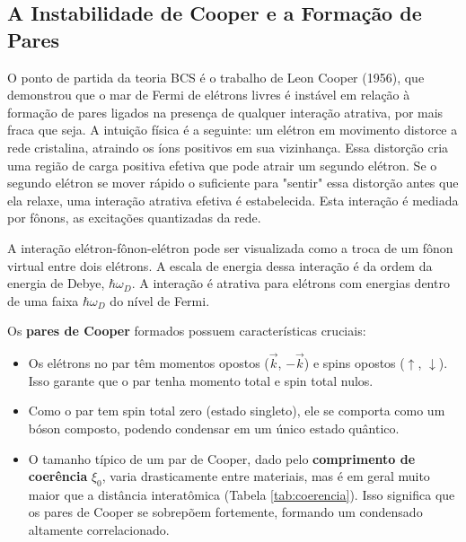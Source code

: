 \documentclass[12pt, a4paper, oneside]{report}
\begin{document}
\subsection{A Instabilidade de Cooper e a Formação de Pares}

O ponto de partida da teoria BCS é o trabalho de Leon Cooper (1956), que demonstrou que o mar de Fermi de elétrons livres é instável em relação à formação de pares ligados na presença de qualquer interação atrativa, por mais fraca que seja. A intuição física é a seguinte: um elétron em movimento distorce a rede cristalina, atraindo os íons positivos em sua vizinhança. Essa distorção cria uma região de carga positiva efetiva que pode atrair um segundo elétron. Se o segundo elétron se mover rápido o suficiente para "sentir" essa distorção antes que ela relaxe, uma interação atrativa efetiva é estabelecida. Esta interação é mediada por fônons, as excitações quantizadas da rede.

A interação elétron-fônon-elétron pode ser visualizada como a troca de um fônon virtual entre dois elétrons. A escala de energia dessa interação é da ordem da energia de Debye, $\hbar \omega_D$. A interação é atrativa para elétrons com energias dentro de uma faixa $\hbar \omega_D$ do nível de Fermi.

Os \textbf{pares de Cooper} formados possuem características cruciais:
\begin{itemize}
    \item Os elétrons no par têm momentos opostos ($\vec{k}$, $-\vec{k}$) e spins opostos ($\uparrow$, $\downarrow$). Isso garante que o par tenha momento total e spin total nulos.
    \item Como o par tem spin total zero (estado singleto), ele se comporta como um bóson composto, podendo condensar em um único estado quântico.
    \item O tamanho típico de um par de Cooper, dado pelo \textbf{comprimento de coerência} $\xi_0$, varia drasticamente entre materiais, mas é em geral muito maior que a distância interatômica (Tabela \ref{tab:coerencia}). Isso significa que os pares de Cooper se sobrepõem fortemente, formando um condensado altamente correlacionado.
\end{itemize}
\end{document}
